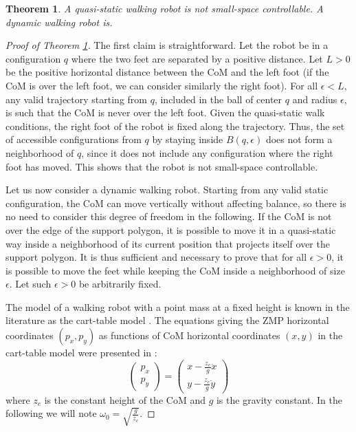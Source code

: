 \documentclass{article}
\newtheorem{theorem}{Theorem}
\begin{document}
\begin{theorem}
\label{thm:humanoid-ssc}
A quasi-static walking robot is not small-space controllable. A dynamic walking robot is.
\end{theorem}

\begin{proof}[Proof of Theorem \ref{thm:humanoid-ssc}]

The first claim is straightforward. Let the robot be in a configuration $q$ where the two
feet are separated by a positive distance. Let  $L>0$ be the positive horizontal distance
between the CoM and the left foot (if the CoM is over the left foot, we can consider similarly 
the right foot). For all $\epsilon < L$, any valid trajectory starting from $q$, included in
the ball of center $q$ and radius $\epsilon$, is such that the CoM is never over the left foot.
Given the quasi-static walk conditions, the right foot of the robot is fixed along 
the trajectory. Thus, the set of accessible configurations from $q$ by staying inside 
$B(q,\epsilon)$ does not form a neighborhood of $q$, since it does not include any configuration
where the right foot has moved. This shows that the robot is not small-space controllable.

\bigskip

Let us now consider a dynamic walking robot. Starting from any valid static configuration, 
the CoM can move vertically without affecting balance, so there is no need to 
consider this degree of freedom in the following. If the CoM is not over the edge of the support
polygon, it is possible to move it in a quasi-static way inside a neighborhood of its current position that projects itself over the support polygon.
It is thus sufficient and necessary to prove that for all $\epsilon >0$, it is possible to move
the feet while keeping the CoM inside a neighborhood of size $\epsilon$. Let such $\epsilon >0$
be arbitrarily fixed.


The model of a walking robot with a point
mass at a fixed height is known in the literature as the cart-table model \cite{kajita2003biped}.
The equations  giving  the   ZMP  horizontal  coordinates  $(p_x,p_y)$  as
functions  of CoM  horizontal coordinates $(x,y)$  in the  cart-table  model were
presented in \cite{kajita2003biped}:
\begin{equation}
\label{eq:walk-zmp}
\left(
\begin{array}{c}
p_x\\ p_y
\end{array}
\right) = \displaystyle \left(
\begin{array}{c}
x - \frac{z_c}{g} \ddot{x}\\ y - \frac{z_c}{g} \ddot{y}
\end{array}
\right)
\end{equation}
where $z_c$ is  the constant height of the CoM and  $g$ is the gravity
constant.    In    the    following    we    will    note    $\omega_0
=\sqrt{\frac{g}{z_c}}$.


\end{proof}
\end{document}
